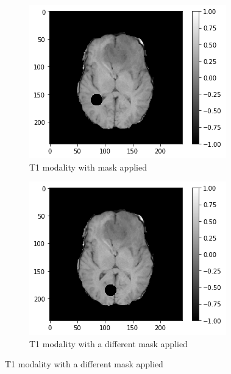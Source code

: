\begin{figure}[H]
    \centering
    \begin{subfigure}[t]{.33\textwidth}
        \centering
        \includegraphics[width=\linewidth]{chapters/06_hdm/images_masked/masked_0.png}
        \caption{T1 modality with mask applied}
    \end{subfigure}%
    \begin{subfigure}[t]{.33\textwidth}
        \centering
        \includegraphics[width=\linewidth]{chapters/06_hdm/images_masked/masked_4.png}
        \caption{T1 modality with a different mask applied}
    \end{subfigure}

\end{figure}

